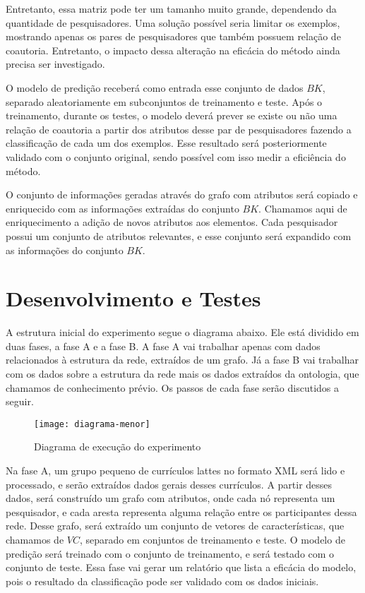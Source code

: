 Entretanto, essa matriz pode ter um tamanho muito grande, dependendo da quantidade de pesquisadores. Uma solução possível seria limitar os exemplos, mostrando apenas os pares de pesquisadores que também possuem relação de coautoria. Entretanto, o impacto dessa alteração na eficácia do método ainda precisa ser investigado.

O modelo de predição receberá como entrada esse conjunto de dados $BK$, separado aleatoriamente em subconjuntos de treinamento e teste. Após o treinamento, durante os testes, o modelo deverá prever se existe ou não uma relação de coautoria a partir dos atributos desse par de pesquisadores fazendo a classificação de cada um dos exemplos. Esse resultado será posteriormente validado com o conjunto original, sendo possível com isso medir a eficiência do método.

O conjunto de informações geradas através do grafo com atributos será copiado e enriquecido com as informações extraídas do conjunto $BK$. Chamamos aqui de enriquecimento a adição de novos atributos aos elementos. Cada pesquisador possui um conjunto de atributos relevantes, e esse conjunto será expandido com as informações do conjunto $BK$.

\section{Desenvolvimento e Testes}
\label{sec:desenvolvimento-testes}

A estrutura inicial do experimento segue o diagrama abaixo. Ele está dividido em duas fases, a fase A e a fase B. A fase A vai trabalhar apenas com dados relacionados à estrutura da rede, extraídos de um grafo. Já a fase B vai trabalhar com os dados sobre a estrutura da rede mais os dados extraídos da ontologia, que chamamos de conhecimento prévio. Os passos de cada fase serão discutidos a seguir.

\begin{figure}[!h]
  \centering
  \texttt{[image: diagrama-menor]}
  \caption{Diagrama de execução do experimento}
  \label{fig:diagrama-experimento}
\end{figure}

Na fase A, um grupo pequeno de currículos lattes no formato XML será lido e processado, e serão extraídos dados gerais desses currículos. A partir desses dados, será construído um grafo com atributos, onde cada nó representa um pesquisador, e cada aresta representa alguma relação entre os participantes dessa rede. Desse grafo, será extraído um conjunto de vetores de características, que chamamos de $VC$, separado em conjuntos de treinamento e teste. O modelo de predição será treinado com o conjunto de treinamento, e será testado com o conjunto de teste. Essa fase vai gerar um relatório que lista a eficácia do modelo, pois o resultado da classificação pode ser validado com os dados iniciais.

